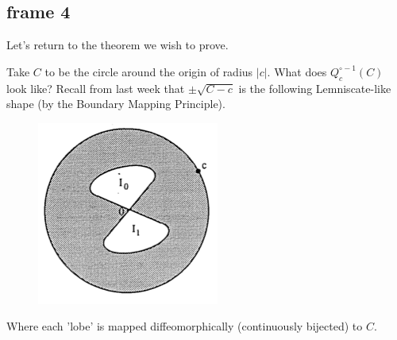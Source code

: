 \documentclass[xcolor=x11names,compress]{beamer}
\renewcommand{\(}{\begin{columns}}
\renewcommand{\)}{\end{columns}}
\newcommand{\<}[1]{\begin{column}{#1}}
\renewcommand{\>}{\end{column}}
\begin{document}
\subsection{frame 4}
\begin{frame}

Let's return to the theorem we wish to prove. 

\vspace{.4cm}
\pause


Take $C$ to be the circle around the origin of radius $|c|$. What does $Q^{\circ -1}_c(C)$ look like? Recall from last week that $\pm \sqrt{C - c}$ is the following Lemniscate-like shape (by the Boundary Mapping Principle).


\begin{figure}
\includegraphics[scale=.4]{lobes1.png}
\end{figure}



Where each 'lobe' is mapped diffeomorphically (continuously bijected) to $C$.

\end{frame}


\end{document}
